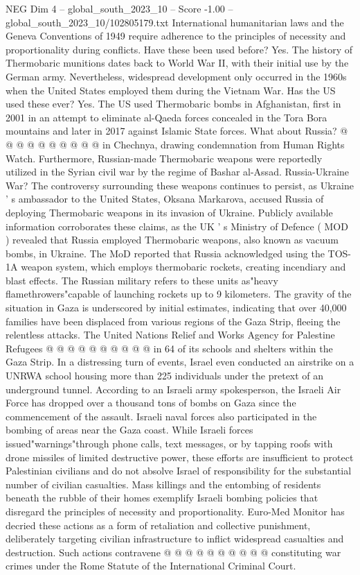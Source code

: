 \begin{textsample}{NEG Dim 4 – global\_south\_2023\_10 – Score -1.00 – global\_south\_2023\_10/102805179.txt}
International humanitarian laws and the Geneva Conventions of 1949 require adherence to the principles of necessity and proportionality during conflicts.
Have these been used before?
Yes.
The history of Thermobaric munitions dates back to World War II, with their initial use by the German army.
Nevertheless, widespread development only occurred in the 1960s when the United States employed them during the Vietnam War.
Has the US used these ever?
Yes.
The US used Thermobaric bombs in Afghanistan, first in 2001 in an attempt to eliminate al-Qaeda forces concealed in the Tora Bora mountains and later in 2017 against Islamic State forces.
What about Russia? @ @ @ @ @ @ @ @ @ @ in Chechnya, drawing condemnation from Human Rights Watch.
Furthermore, Russian-made Thermobaric weapons were reportedly utilized in the Syrian civil war by the regime of Bashar al-Assad.
Russia-Ukraine War?
The controversy surrounding these weapons continues to persist, as Ukraine ' s ambassador to the United States, Oksana Markarova, accused Russia of deploying Thermobaric weapons in its invasion of Ukraine.
Publicly available information corroborates these claims, as the UK ' s Ministry of Defence ( MOD ) revealed that Russia employed Thermobaric weapons, also known as vacuum bombs, in Ukraine.
The MoD reported that Russia acknowledged using the TOS-1A weapon system, which employs thermobaric rockets, creating incendiary and blast effects.
The Russian military refers to these units as"heavy flamethrowers"capable of launching rockets up to 9 kilometers.
The gravity of the situation in Gaza is underscored by initial estimates, indicating that over 40,000 families have been displaced from various regions of the Gaza Strip, fleeing the relentless attacks.
The United Nations Relief and Works Agency for Palestine Refugees @ @ @ @ @ @ @ @ @ @ in 64 of its schools and shelters within the Gaza Strip.
In a distressing turn of events, Israel even conducted an airstrike on a UNRWA school housing more than 225 individuals under the pretext of an underground tunnel.
According to an Israeli army spokesperson, the Israeli Air Force has dropped over a thousand tons of bombs on Gaza since the commencement of the assault.
Israeli naval forces also participated in the bombing of areas near the Gaza coast.
While Israeli forces issued"warnings"through phone calls, text messages, or by tapping roofs with drone missiles of limited destructive power, these efforts are insufficient to protect Palestinian civilians and do not absolve Israel of responsibility for the substantial number of civilian casualties.
Mass killings and the entombing of residents beneath the rubble of their homes exemplify Israeli bombing policies that disregard the principles of necessity and proportionality.
Euro-Med Monitor has decried these actions as a form of retaliation and collective punishment, deliberately targeting civilian infrastructure to inflict widespread casualties and destruction.
Such actions contravene @ @ @ @ @ @ @ @ @ @ constituting war crimes under the Rome Statute of the International Criminal Court.

\end{textsample}

